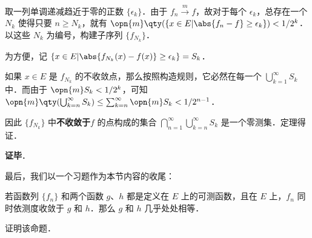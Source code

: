 取一列单调递减趋近于零的正数 $\{\epsilon_k\}$．由于 $f_n\overset{m}\to f$，故对于每个 $\epsilon_k$，总存在一个 $N_k$ 使得只要 $n\geq N_k$，就有 $\opn{m}\qty(\{x\in E|\abs{f_n-f}\geq\epsilon_k\})<1/2^k$．以这些 $N_k$ 为编号，构建子序列 $\{f_{N_k}\}$．

为方便，记 $\{x\in E|\abs{f_{N_k}(x)-f(x)}\geq \epsilon_k\}=S_k$．

如果 $x\in E$ 是 $f_{N_k}$ 的不收敛点，那么按照构造规则，它必然在每一个 $\bigcup^\infty_{k=1}S_k$ 中．而由于 $\opn{m}S_k<1/2^k$，可知 $\opn{m}\qty(\bigcup^\infty_{k=n}S_k)\leq \sum^{\infty}_{k=n}\opn{m}S_k<1/2^{n-1}$．

因此 $\{f_{N_k}\}$ 中\textbf{不收敛于}$f$ 的点构成的集合 $\bigcap^\infty_{n=1}\bigcup^\infty_{k=n}S_k$ 是一个零测集．定理得证．



\textbf{证毕}．


最后，我们以一个习题作为本节内容的收尾：

\begin{exercise}{}

若函数列 $\{f_n\}$ 和两个函数 $g$、$h$ 都是定义在 $E$ 上的可测函数，且在 $E$ 上，$f_n$ 同时依测度收敛于 $g$ 和 $h$．那么 $g$ 和 $h$ 几乎处处相等．

证明该命题．

\end{exercise}








